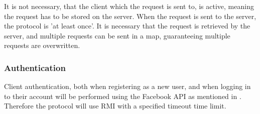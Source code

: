 It is not necessary, that the client which the request is sent to, is active, meaning the request has to be stored on the server. When the request is sent to the server, the protocol is 'at least once'. It is necessary that the request is retrieved by the server, and multiple requests can be sent in a map, guaranteeing multiple requests are overwritten.


\subsubsection{Authentication}

Client authentication, both when registering as a new user, and when logging in to their account will be performed using the Facebook API as mentioned in . Therefore the protocol will use RMI with a specified timeout time limit. 






